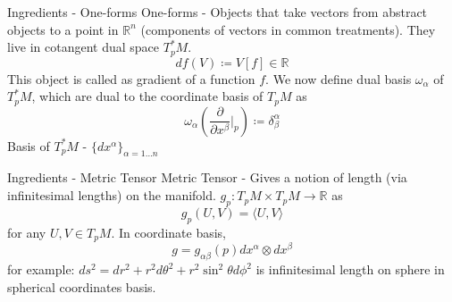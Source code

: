 \documentclass{beamer}
\begin{document}
\begin{frame}{Ingredients - One-forms}
    One-forms - Objects that take vectors from abstract objects to a point in $\mathbb{R}^{n}$ (components of vectors in common treatments). They live in cotangent dual space $T^{\ast}_{p}M$.
    \begin{equation*}
         df(V) \coloneqq V[f]\in \mathbb{R}
    \end{equation*}
    This object is called as gradient of a function $f$. We now define dual basis $\omega_{\alpha}$ of $T^{\ast}_{p}M$, which are dual to the coordinate basis of $T_{p}M$ as
    \begin{equation*}
        \omega_{\alpha}(\frac{\partial}{\partial x^{\beta}}\Bigr|_{p}) \coloneqq \delta^{\alpha}_{\beta}
    \end{equation*}
    Basis of $T^{\ast}_{p}M$ - $\{dx^{\alpha}\}_{\alpha=1\dots n}$
\end{frame}
\begin{frame}{Ingredients - Metric Tensor}
    Metric Tensor - Gives a notion of length (via infinitesimal lengths) on the manifold.
    $g_{p}\colon T_{p}M \times T_{p}M\to \mathbb{R}$ as
    \begin{equation*}
        g_{p}(U, V) = \langle U, V\rangle
    \end{equation*} for any $U, V\in T_{p}M$.
    In coordinate basis,
    \begin{equation*} 
        g = g_{\alpha\beta}(p)dx^{\alpha}\otimes dx^{\beta}
    \end{equation*}
    for example: $ds^{2} = dr^{2} + r^{2}d\theta^{2} + r^{2}\sin^{2}\theta d\phi^{2}$ is infinitesimal length on sphere in spherical coordinates basis.
\end{frame} 
\end{document}
